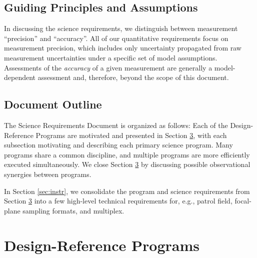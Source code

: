 \documentclass[11pt,a4paper,twoside,onecolumn,openany,final,oldfontcommands]{memoir}
\begin{document}

\section{Guiding Principles and Assumptions}

In discussing the science requirements, we distinguish between measurement ``precision'' and ``accuracy''. All of our quantitative requirements focus on measurement precision, which includes only uncertainty propagated from raw measurement uncertainties under a specific set of model assumptions. Assessments of the \textit{accuracy} of a given measurement are generally a model-dependent assessment and, therefore, beyond the scope of this document.

\section{Document Outline}

The Science Requirements Document is organized as follows:  Each of the Design-Reference Programs are motivated and presented in Section \ref{sec:key}, with each subsection motivating and describing each primary science program.  Many programs share a common discipline, and multiple programs are more efficiently executed simultaneously.  We close Section \ref{sec:key} by discussing possible observational synergies between programs. 


In Section \ref{sec:instr}, we consolidate the program and science requirements from Section \ref{sec:key} into a few high-level technical requirements for, e.g., patrol field, focal-plane sampling formats, and multiplex. 



\chapter{Design-Reference Programs}
\label{sec:key}
\end{document}
